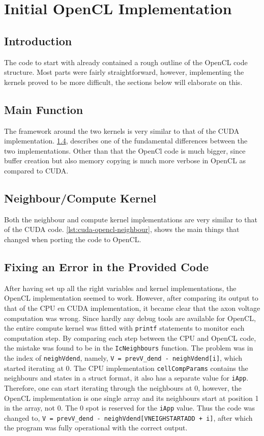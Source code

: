 \documentclass[final]{report}
\begin{document}
\chapter{Initial OpenCL Implementation}\label{ch:initopencl}

\section{Introduction}
The code to start with already contained a rough outline of the OpenCL code structure.
Most parts were fairly straightforward, however, implementing the kernels proved to be more difficult, the sections below will elaborate on this.

\section{Main Function}
The framework around the two kernels is very similar to that of the CUDA implementation.
\cref{sec:code-error}, describes one of the fundamental differences between the two implementations.
Other than that the OpenCl code is much bigger, since buffer creation but also memory copying is much more verbose in OpenCL as compared to CUDA.

\section{Neighbour/Compute Kernel}
Both the neighbour and compute kernel implementations are very similar to that of the CUDA code.
\cref{lst:cuda-opencl-neighbour}, shows the main things that changed when porting the code to OpenCL.


\section{Fixing an Error in the Provided Code}\label{sec:code-error}
After having set up all the right variables and kernel implementations, the OpenCL implementation seemed to work.
However, after comparing its output to that of the CPU en CUDA implementation, it became clear that the axon voltage computation was wrong.
Since hardly any debug tools are available for OpenCL, the entire compute kernel was fitted with \texttt{printf} statements to monitor each computation step.
By comparing each step between the CPU and OpenCL code, the mistake was found to be in the \texttt{IcNeighbours} function.
The problem was in the index of \texttt{neighVdend}, namely, \texttt{V = prevV\_dend - neighVdend[i]\;}, which started iterating at 0.
The CPU implementation \texttt{cellCompParams} contains the neighbours and states in a struct format, it also has a separate value for \texttt{iApp}.
Therefore, one can start iterating through the neighbours at 0, however, the OpenCL implementation is one single array and its neighbours start at position 1 in the array, not 0.
The 0 spot is reserved for the \texttt{iApp} value.
Thus the code was changed to, \texttt{V = prevV\_dend - neighVdend[VNEIGHSTARTADD + i]\;}, after which the program was fully operational with the correct output.
\end{document}
